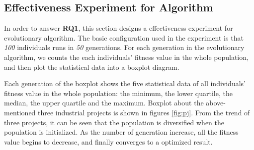 \subsection{Effectiveness Experiment for Algorithm}
%
In order to answer \textbf{RQ1}, this section designs a effectiveness experiment
for evolutionary algorithm. The basic configuration used in the experiment is
that \emph{100} individuals runs in \emph{50} generations. For each generation
in the evolutionary algorithm, we counts the each individuals' fitness value in
the whole population, and then plot the statistical data into a boxplot diagram.


Each generation of the boxplot shows the five statistical data of all
individuals' fitness value in the whole population: the minimum, the lower
quartile, the median, the upper quartile and the maximum. Boxplot about the
above-mentioned three industrial projects is shown in figures \ref{fig:pj}. From
the trend of three projects, it can be seen that the population is diversified
when the population is initialized. As the number of generation increase, all
the fitness value begins to decrease, and finally converges to a optimized
result.

